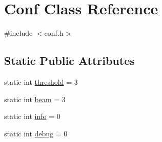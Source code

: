 \hypertarget{class_conf}{\section{Conf Class Reference}
\label{class_conf}
}


{\ttfamily \#include $<$conf.\+h$>$}

\subsection*{Static Public Attributes}
\begin{DoxyCompactItemize}
\item 
static int \hyperlink{class_conf_a711f62286eebacda65e1ae8da7eaebd2}{threshold} = 3
\item 
static int \hyperlink{class_conf_a4c3c0b9e5ea26314911bf1e645779377}{beam} = 3
\item 
static int \hyperlink{class_conf_adba927d772295408e9c93e9b7bf30eb8}{info} = 0
\item 
static int \hyperlink{class_conf_a142f3e8a32431f0c5d2d1ed25a547979}{debug} = 0
\end{DoxyCompactItemize}


